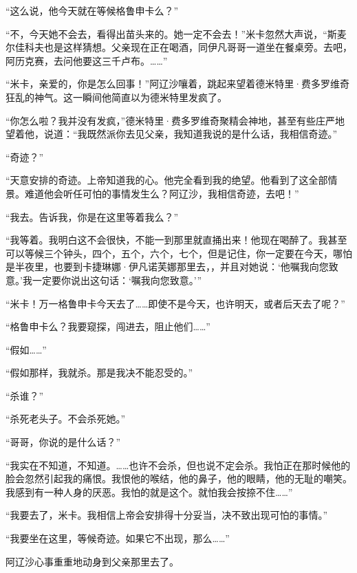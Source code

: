\par “这么说，他今天就在等候格鲁申卡么？”
\par “不，今天她不会去，看得出苗头来的。她一定不会去！”米卡忽然大声说，“斯麦尔佳科夫也是这样猜想。父亲现在正在喝酒，同伊凡哥哥一道坐在餐桌旁。去吧，阿历克赛，去问他要这三千卢布。……”
\par “米卡，亲爱的，你是怎么回事！”阿辽沙嚷着，跳起来望着德米特里·费多罗维奇狂乱的神气。这一瞬间他简直以为德米特里发疯了。
\par “你怎么啦？我并没有发疯，”德米特里·费多罗维奇聚精会神地，甚至有些庄严地望着他，说道：“我既然派你去见父亲，我知道我说的是什么话，我相信奇迹。”
\par “奇迹？”
\par “天意安排的奇迹。上帝知道我的心。他完全看到我的绝望。他看到了这全部情景。难道他会听任可怕的事情发生么？阿辽沙，我相信奇迹，去吧！”
\par “我去。告诉我，你是在这里等着我么？”
\par “我等着。我明白这不会很快，不能一到那里就直捅出来！他现在喝醉了。我甚至可以等候三个钟头，四个，五个，六个，七个，但是记住，你一定要在今天，哪怕是半夜里，也要到卡捷琳娜·伊凡诺芙娜那里去，，并且对她说：‘他嘱我向您致意。’我一定要你说出这句话：‘嘱我向您致意。’”
\par “米卡！万一格鲁申卡今天去了……即使不是今天，也许明天，或者后天去了呢？”
\par “格鲁申卡么？我要窥探，闯进去，阻止他们……”
\par “假如……”
\par “假如那样，我就杀。那是我决不能忍受的。”
\par “杀谁？”
\par “杀死老头子。不会杀死她。”
\par “哥哥，你说的是什么话？”
\par “我实在不知道，不知道。……也许不会杀，但也说不定会杀。我怕正在那时候他的脸会忽然引起我的痛恨。我恨他的喉结，他的鼻子，他的眼睛，他的无耻的嘲笑。我感到有一种人身的厌恶。我怕的就是这个。就怕我会按捺不住……”
\par “我要去了，米卡。我相信上帝会安排得十分妥当，决不致出现可怕的事情。”
\par “我要坐在这里，等候奇迹。如果它不出现，那么……”
\par 阿辽沙心事重重地动身到父亲那里去了。
